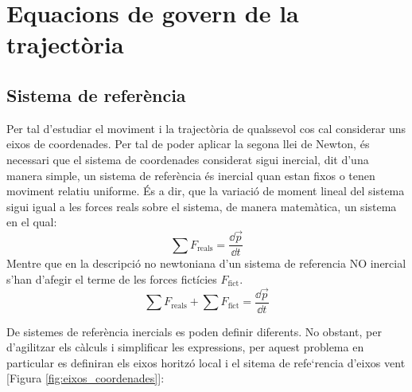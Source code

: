 
\section{Equacions de govern de la trajectòria}

\subsection{Sistema de referència}
Per tal d'estudiar el moviment i la trajectòria de qualssevol cos cal considerar uns eixos de coordenades. Per tal de poder aplicar la segona llei de Newton, és necessari que el sistema de coordenades considerat sigui inercial, dit d'una manera simple, un sistema de referència és inercial quan estan fixos o tenen moviment relatiu uniforme. És a dir, que la variació de moment lineal del sistema sigui igual a les forces reals sobre el sistema, de manera matemàtica, un sistema en el qual:
\begin{equation}
    \sum F_{\mathrm{reals}} = \frac{\dd \Vec{p}}{\dd t}
\end{equation}
Mentre que en la descripció no newtoniana d'un sistema de referencia NO inercial s'han d'afegir el terme de les forces fictícies $F_{\mathrm{fict}}$.
\begin{equation}
    \sum F_{\mathrm{reals}} + \sum F_{\mathrm{fict}}= \frac{\dd \Vec{p}}{\dd t}
\end{equation}

De sistemes de referència inercials es poden definir diferents. No obstant, per d'agilitzar els càlculs i simplificar les expressions, per aquest problema en particular es definiran els eixos horitzó local i el sitema de refe`rencia d'eixos vent [Figura \ref{fig:eixos_coordenades}]:

